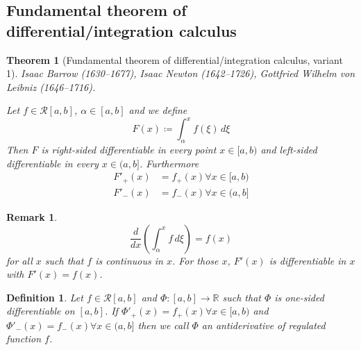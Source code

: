 \documentclass{article}
\newtheorem{theorem}{Theorem}  \numberwithin{theorem}{section}
\newtheorem{definition}{Definition}  \numberwithin{definition}{section}
\newtheorem{remark}{Remark}  \numberwithin{remark}{section}
\begin{document}
\subsection{Fundamental theorem of differential/integration calculus}

\begin{theorem}[Fundamental theorem of differential/integration calculus, variant 1] %
  \label{ftofic}
  Isaac Barrow (1630--1677), Isaac Newton (1642--1726), Gottfried Wilhelm von Leibniz (1646--1716).

  Let $f \in \mathcal R[a,b]$, $\alpha \in [a,b]$ and we define
  \[ F(x) \coloneqq \int_{\alpha}^x f(\xi) \, d\xi \]
  Then $F$ is right-sided differentiable in every point $x \in [a,b)$ and left-sided differentiable in every $x \in (a,b]$.
  Furthermore
  \begin{align}
    \label{ftdi}
    F'_+(x) &= f_+(x) \forall x \in [a,b) \\
    F'_-(x) &= f_-(x) \forall x \in (a,b]
  \end{align}
\end{theorem}

\begin{remark}
  \[ \frac{d}{dx} \left(\int_\alpha^x f \, d\xi\right) = f(x) \]
  for all $x$ such that $f$ is continuous in $x$.
  For those $x$, $F'(x)$ is differentiable in $x$ with $F'(x) = f(x)$.
\end{remark}

\begin{definition} %
  \label{def10}
  Let $f \in \mathcal R[a,b]$ and $\Phi: [a,b] \to \mathbb R$ such that $\Phi$ is one-sided differentiable on $[a,b]$.
  If $\Phi'_+(x) = f_+(x) \forall x \in [a,b)$ and $\Phi'_-(x) = f_-(x) \forall x \in (a,b]$
  then we call $\Phi$ an antiderivative of regulated function $f$.
\end{definition}
\end{document}
